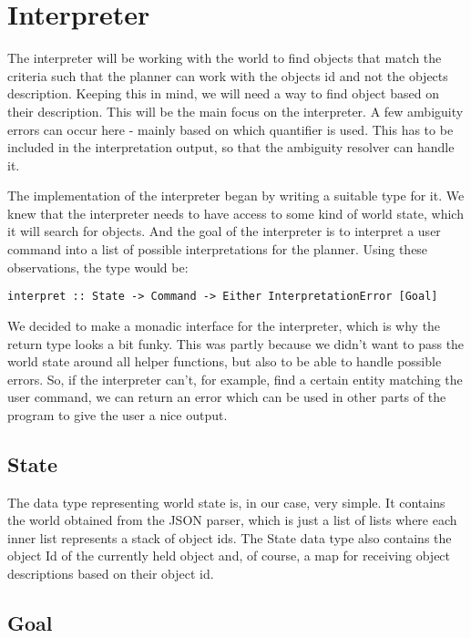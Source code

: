 \section*{Interpreter}
The interpreter will be working with the world to find objects that match the criteria such that the planner can work with the objects id and not the objects description. Keeping this in mind, we will need a way to find object based on their description. This will be the main focus on the interpreter. A few ambiguity errors can occur here - mainly based on which quantifier is used. This has to be included in the interpretation output, so that the ambiguity resolver can handle it.

The implementation of the interpreter began by writing a suitable type for it.
We knew that the interpreter needs to have access to some kind of world state, which it will search for objects.
And the goal of the interpreter is to interpret a user command into a list of possible interpretations for the planner.
Using these observations, the type would be:

\begin{lstlisting}
interpret :: State -> Command -> Either InterpretationError [Goal]
\end{lstlisting}

We decided to make a monadic interface for the interpreter, which is why the return type looks a bit funky. This was partly because we didn't want to pass the world state around all helper functions, but also to be able to handle possible errors.
So, if the interpreter can't, for example, find a certain entity matching the user command, we can return an error which can be used in other parts of the program to give the user a nice output.

\subsection*{State}
The data type representing world state is, in our case, very simple.
It contains the world obtained from the JSON parser, which is just a list of lists where each inner list represents a stack of object ids.
The State data type also contains the object Id of the currently held object and, of course, a map for receiving object descriptions based on their object id.

\subsection*{Goal}

